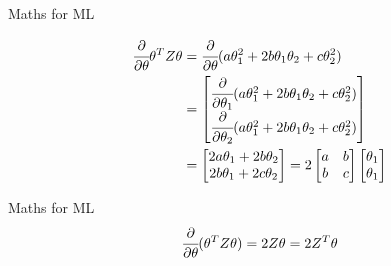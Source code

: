 \documentclass{beamer}
\begin{document}
\begin{frame}{Maths for ML}
    
    \begin{center}
    
        \begin{align}
        \label{eqn*:eqlabel}
        \begin{split}
            \cfrac{\partial}{\partial \theta} \theta^{T} Z \theta &= \cfrac{\partial}{\partial \theta} (a\theta_{1}^{2} + 2b\theta_{1}\theta_{2}+c\theta_{2}^{2} )\\
            &= \begin{bmatrix}\cfrac{\partial}{\partial \theta_{1}} (a\theta_{1}^{2} + 2b\theta_{1}\theta_{2}+c\theta_{2}^{2} )\\
            \cfrac{\partial}{\partial \theta_{2}} (a\theta_{1}^{2} + 2b\theta_{1}\theta_{2}+c\theta_{2}^{2} )
            \end{bmatrix}\\
            &=\begin{bmatrix}2a\theta_{1}+2b\theta_{2}\\
            2b\theta_{1}+2c\theta_{2}\end{bmatrix}
            =  2\begin{bmatrix}a&b\\b&c\end{bmatrix}\begin{bmatrix}\theta_{1}\\ \theta_{1} \end{bmatrix}
        \end{split}
    \end{align}
    \end{center}
\end{frame}

\begin{frame}{Maths for ML}
    \begin{equation*}
        \cfrac{\partial}{\partial \theta} (\theta^{T}Z\theta) = 2Z\theta = 2Z^{T}\theta
    \end{equation*}
\end{frame}
\end{document}
